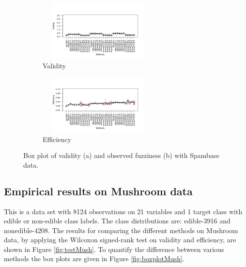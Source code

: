 \documentclass[main]{subfiles}
\begin{document}
\begin{figure}[h]
\centering
\begin{subfigure}{.5\textwidth}
  \centering
  \includegraphics[width=6cm,height=3cm]{images/boxplotSB}
  \caption{Validity}
  \label{fig:boxplotValBC}
\end{subfigure}%
\begin{subfigure}{.5\textwidth}
  \centering
  \includegraphics[width=6cm,height=3cm]{images/boxplotSB_eff}
  \caption{Efficiency}
  \label{fig:boxplotEffBC}
\end{subfigure}%
\caption{Box plot of validity (a) and observed fuzziness (b) with Spambase data.} \label{fig:boxplotSpam}
\end{figure}

\subsection{Empirical results on Mushroom data}
This is a data set with 8124 observations on 21 variables and 1 target class with edible or non-edible class labels. The class distributions are: edible-3916 and nonedible-4208.
The results for comparing the different methods on Mushroom data, by applying the Wilcoxon signed-rank test on validity and efficiency, are shown in Figure \ref{fig:testMush}. To quantify the difference between various methods the box plots are given in Figure \ref{fig:boxplotMush}.
\end{document}
